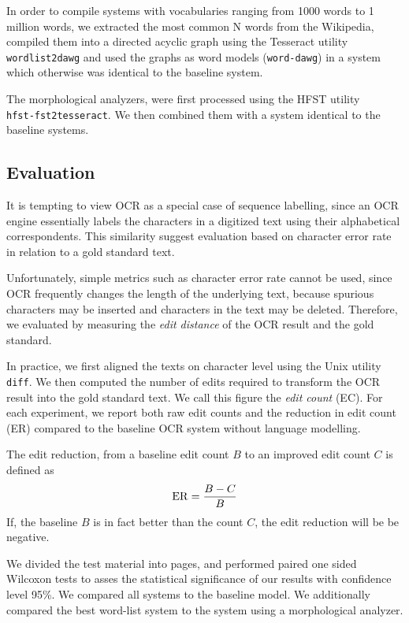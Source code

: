 \documentclass[b5paper]{article}
\begin{document}
In order to compile systems with vocabularies ranging from 1000 words
to 1 million words, we extracted the most common N words from the
Wikipedia, compiled them into a directed acyclic graph using the
Tesseract utility {\tt wordlist2dawg} and used the graphs as word
models ({\tt word-dawg}) in a system which otherwise was identical to
the baseline system.

The morphological analyzers, were first processed using the HFST
utility\\{\tt hfst-fst2tesseract}. We then combined them with a system
identical to the baseline systems. 

\subsection{Evaluation}
It is tempting to view OCR as a special case of sequence labelling,
since an OCR engine essentially labels the characters in a digitized
text using their alphabetical correspondents. This similarity suggest
evaluation based on character error rate in relation to a gold
standard text.

Unfortunately, simple metrics such as character error rate cannot be
used, since OCR frequently changes the length of the underlying text,
because spurious characters may be inserted and characters in the text
may be deleted. Therefore, we evaluated by measuring the {\it edit
  distance} \cite{levenshtein66} of the OCR result and the gold
standard.

In practice, we first aligned the texts on character level using the
Unix utility {\tt diff}. We then computed the number of edits required
to transform the OCR result into the gold standard text. We call this
figure the {\it edit count} (EC). For each experiment, we report both
raw edit counts and the reduction in edit count (ER) compared to the
baseline OCR system without language modelling.

The edit reduction, from a baseline edit count $B$ to an improved edit
count $C$ is defined as
$${\rm ER} = \frac{B - C}{B}$$
If, the baseline $B$ is in fact better than the count $C$, the edit
reduction will be be negative.

We divided the test material into pages, and performed paired one
sided Wilcoxon tests to asses the statistical significance of our
results with confidence level 95\%. We compared all systems to
the baseline model. We additionally compared the best word-list system
to the system using a morphological analyzer.
\end{document}
